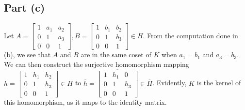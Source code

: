 \documentclass{article}
\begin{document}
\subsection*{Part (c)}
Let $A = \begin{bmatrix} 1 & a_1 & a_2 \\ 0 & 1 & a_3 \\ 0 & 0 & 1\end{bmatrix}, B = \begin{bmatrix} 1 & b_1 & b_2 \\ 0 & 1 & b_3 \\ 0 & 0 & 1\end{bmatrix} \in H$. From the computation done in (b), we see that $A$ and $B$ are in the same coset of $K$ when $a_1 = b_1$ and $a_3 = b_3$. We can then construct the surjective homomorphism mapping $h = \begin{bmatrix} 1 & h_1 & h_2 \\ 0 & 1 & h_3 \\ 0 & 0 & 1\end{bmatrix} \in H$ to $\overline{h} = \overline{\begin{bmatrix} 1 & h_1 & 0 \\ 0 & 1 & h_3 \\ 0 & 0 & 1\end{bmatrix}} \in \overline{H}$. Evidently, $K$ is the kernel of this homomorphism, as it maps to the identity matrix.

\newpage

\problem
\end{document}
